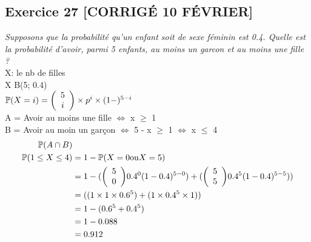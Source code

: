 \subsection*{Exercice 27 [CORRIGÉ 10 FÉVRIER]}
\textit{Supposons que la probabilité qu’un enfant soit de sexe féminin est 0.4. Quelle est la probabilité d’avoir, parmi 5 enfants, au moins un garcon et au moins une fille ?}\\
X: le nb de filles \\
X \til B(5; 0.4)\\
$\mathbb{P}(X = i) = {\left( \begin{array}{cc}5 \\ i\end{array} \right)} \times p^i\times(1-)^{5 - i}$\\
A = Avoir au moins une fille $\Leftrightarrow$ x $\geq$ 1 \\
B = Avoir au moin un garçon $\Leftrightarrow$ 5 - x $\geq$ 1 $\Leftrightarrow$ x $\leq$ 4
\begin{align*}
    \mathbb{P}(A \cap B) &\\
    \mathbb{P}(1 \leq X \leq 4) &= 1 - \mathbb{P}(X=0 \text{ou} X =5)\\
    &= 1 - ({\left( \begin{array}{cc}5 \\ 0\end{array} \right)}0.4^0(1-0.4)^{ 5-0}) + ({\left( \begin{array}{cc}5 \\ 5\end{array} \right)}0.4^5(1-0.4)^{5-5}) )\\
    &=((1\times1\times0.6^5)+(1\times0.4^5\times1))\\
    &=1- (0.6^5 + 0.4^5)\\
    &= 1 - 0.088 \\
    & = 0.912
\end{align*}